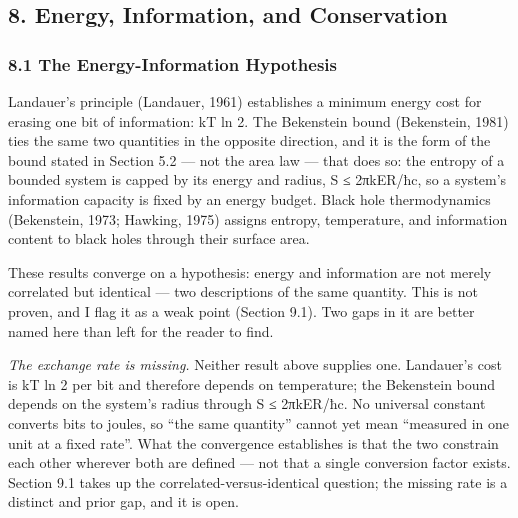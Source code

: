 \documentclass[
]{article}
\begin{document}
\hypertarget{energy-information-and-conservation}{%
\subsection{8. Energy, Information, and
Conservation}\label{energy-information-and-conservation}}

\hypertarget{the-energy-information-hypothesis}{%
\subsubsection{8.1 The Energy-Information
Hypothesis}\label{the-energy-information-hypothesis}}

Landauer's principle (Landauer, 1961) establishes a minimum energy cost
for erasing one bit of information: kT ln 2. The Bekenstein bound
(Bekenstein, 1981) ties the same two quantities in the opposite
direction, and it is the form of the bound stated in Section 5.2 --- not
the area law --- that does so: the entropy of a bounded system is capped
by its energy and radius, S ≤ 2πkER/ħc, so a system's information
capacity is fixed by an energy budget. Black hole thermodynamics
(Bekenstein, 1973; Hawking, 1975) assigns entropy, temperature, and
information content to black holes through their surface area.

These results converge on a hypothesis: energy and information are not
merely correlated but identical --- two descriptions of the same
quantity. This is not proven, and I flag it as a weak point (Section
9.1). Two gaps in it are better named here than left for the reader to
find.

\emph{The exchange rate is missing.} Neither result above supplies one.
Landauer's cost is kT ln 2 per bit and therefore depends on temperature;
the Bekenstein bound depends on the system's radius through S ≤
2πkER/ħc. No universal constant converts bits to joules, so ``the same
quantity'' cannot yet mean ``measured in one unit at a fixed rate''.
What the convergence establishes is that the two constrain each other
wherever both are defined --- not that a single conversion factor
exists. Section 9.1 takes up the correlated-versus-identical question;
the missing rate is a distinct and prior gap, and it is open.
\end{document}
